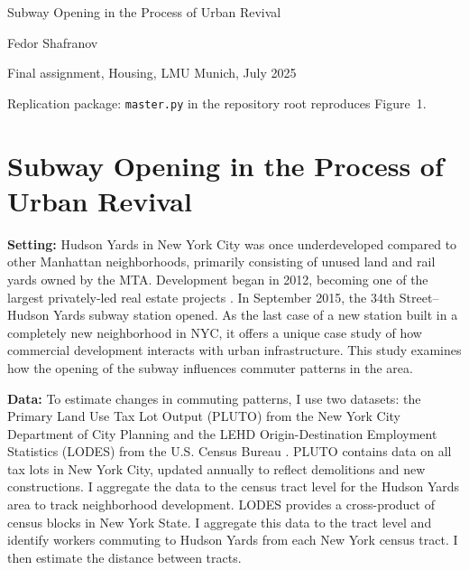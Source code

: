 \documentclass[12pt]{article}
\begin{document}
\begin{titlepage}
\centering
\vspace*{6cm}
{\LARGE Subway Opening in the Process of Urban Revival\par}
\vspace{1.5cm}
{\large Fedor Shafranov\par}
\vspace{0.5cm}
Final assignment, Housing, LMU Munich, July 2025\par
\vfill
{\small Replication package: \texttt{master.py} in the repository root reproduces Figure~1.\par}
\end{titlepage}

\section*{Subway Opening in the Process of Urban Revival}

\textbf{Setting:} Hudson Yards in New York City was once underdeveloped compared to other Manhattan
neighborhoods, primarily consisting of unused land and rail yards owned by the MTA. Development began in
2012, becoming one of the largest privately-led real estate projects \citep{fisher2018}. In September 2015,
the 34th Street--Hudson Yards subway station opened. As the last case of a new station built in a completely
new neighborhood in NYC, it offers a unique case study of how commercial development interacts with urban
infrastructure. This study examines how the opening of the subway influences commuter patterns in the area.

\textbf{Data:} To estimate changes in commuting patterns, I use two datasets: the Primary Land Use Tax Lot
Output (PLUTO) from the New York City Department of City Planning \citeyearpar{pluto2025} and the LEHD
Origin-Destination Employment Statistics (LODES) from the U.S. Census Bureau \citeyearpar{lodes2025}.
PLUTO contains data on all tax lots in New York City, updated annually to reflect demolitions and new
constructions. I aggregate the data to the census tract level for the Hudson Yards area to track
neighborhood development. LODES provides a cross-product of census blocks in New York State. I aggregate
this data to the tract level and identify workers commuting to Hudson Yards from each New York census
tract. I then estimate the distance between tracts.
\end{document}
